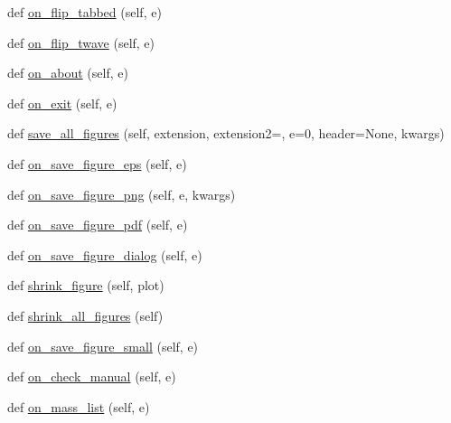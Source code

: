 \begin{DoxyCompactItemize}
\item 
def \hyperlink{class_uni_dec_1_1unidec__modules_1_1mainwindow_1_1_mainwindow_aeb0756c06d6f9b6a30f82dd3a6fd9f54}{on\+\_\+flip\+\_\+tabbed} (self, e)
\item 
def \hyperlink{class_uni_dec_1_1unidec__modules_1_1mainwindow_1_1_mainwindow_a86ea9e9528c40c61eb34f249f2cc9cec}{on\+\_\+flip\+\_\+twave} (self, e)
\item 
def \hyperlink{class_uni_dec_1_1unidec__modules_1_1mainwindow_1_1_mainwindow_a5c994afc0df1beb8a20ecb03f3df49a9}{on\+\_\+about} (self, e)
\item 
def \hyperlink{class_uni_dec_1_1unidec__modules_1_1mainwindow_1_1_mainwindow_a7c0aa3effe9ecc17f0fa40b688ed5e6a}{on\+\_\+exit} (self, e)
\item 
def \hyperlink{class_uni_dec_1_1unidec__modules_1_1mainwindow_1_1_mainwindow_a9c6e28e44bb106264cdeeef5e1940eb4}{save\+\_\+all\+\_\+figures} (self, extension, extension2=\textquotesingle{}\textquotesingle{}, e=0, header=None, kwargs)
\item 
def \hyperlink{class_uni_dec_1_1unidec__modules_1_1mainwindow_1_1_mainwindow_abad47b8da6289af4cc9b15a170199f09}{on\+\_\+save\+\_\+figure\+\_\+eps} (self, e)
\item 
def \hyperlink{class_uni_dec_1_1unidec__modules_1_1mainwindow_1_1_mainwindow_a884518d31f2f1b9049d296f93549016d}{on\+\_\+save\+\_\+figure\+\_\+png} (self, e, kwargs)
\item 
def \hyperlink{class_uni_dec_1_1unidec__modules_1_1mainwindow_1_1_mainwindow_a00205ac38f519c15d768a220e4fba525}{on\+\_\+save\+\_\+figure\+\_\+pdf} (self, e)
\item 
def \hyperlink{class_uni_dec_1_1unidec__modules_1_1mainwindow_1_1_mainwindow_a706b5be2b38e6777a201f0fdc2691645}{on\+\_\+save\+\_\+figure\+\_\+dialog} (self, e)
\item 
def \hyperlink{class_uni_dec_1_1unidec__modules_1_1mainwindow_1_1_mainwindow_a18debdf9093c06b82505c0d434e5347b}{shrink\+\_\+figure} (self, plot)
\item 
def \hyperlink{class_uni_dec_1_1unidec__modules_1_1mainwindow_1_1_mainwindow_a7666329ec63ae8b1d543c45ab2d4c287}{shrink\+\_\+all\+\_\+figures} (self)
\item 
def \hyperlink{class_uni_dec_1_1unidec__modules_1_1mainwindow_1_1_mainwindow_a351dc8045c34e798ff853adc4f88f145}{on\+\_\+save\+\_\+figure\+\_\+small} (self, e)
\item 
def \hyperlink{class_uni_dec_1_1unidec__modules_1_1mainwindow_1_1_mainwindow_a745c40275b361eb08a2278c582636799}{on\+\_\+check\+\_\+manual} (self, e)
\item 
def \hyperlink{class_uni_dec_1_1unidec__modules_1_1mainwindow_1_1_mainwindow_adaba03db2d5dc76e464a77ab997f0d4e}{on\+\_\+mass\+\_\+list} (self, e)
\end{DoxyCompactItemize}
